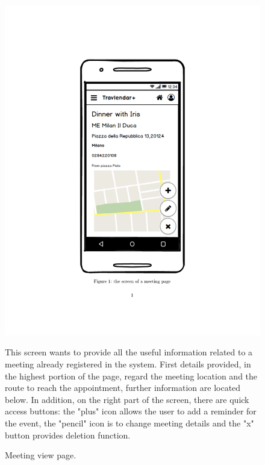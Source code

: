 	\begin{figure}
	\centering
	\includegraphics[width=0.6\linewidth]{mockups/MeetingView}
	\caption{Meeting view page. }
	\label{fig:meeting-view}
	\begin{center}
		This screen wants to provide all the useful information related to a meeting already registered in the system. First details provided, in the highest portion of the page, regard the meeting location and the route to reach the appointment, further information are located below. In addition, on the right part of the screen, there are quick access buttons: the "plus" icon allows the user to add a reminder for the event, the "pencil" icon is to change meeting details and the "x" button provides deletion function. 
	\end{center}
	\end{figure}
\clearpage
